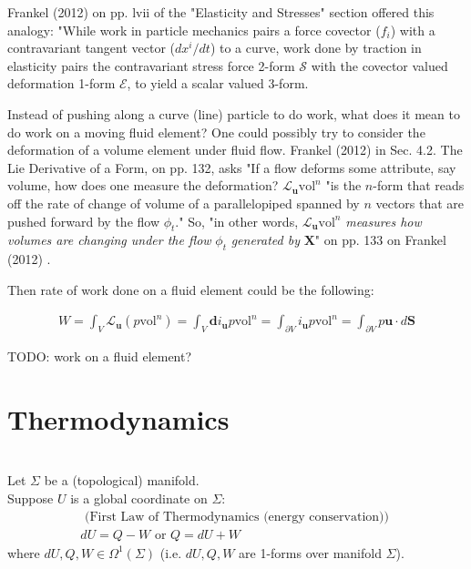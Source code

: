 \documentclass[10pt]{amsart}
\begin{document}
\begin{multicols*}{2}
Frankel (2012) \cite{TFrankel2012} on pp. lvii of the "Elasticity and Stresses" section offered this analogy: "While work in particle mechanics pairs a force covector ($f_i$) with a contravariant tangent vector ($dx^i/dt$) to a curve, work done by traction in elasticity pairs the contravariant stress force 2-form $\mathcal{S}$ with the covector valued deformation 1-form $\mathcal{E}$, to yield a scalar valued 3-form.

Instead of pushing along a curve (line) particle to do work, what does it mean to do work on a moving fluid element? One could possibly try to consider the deformation of a volume element under fluid flow. Frankel (2012) \cite{TFrankel2012} in Sec. 4.2. The Lie Derivative of a Form, on pp. 132, asks "If a flow deforms some attribute, say volume, how does one measure the deformation? $\mathcal{L}_{\mathbf{u}}\text{vol}^n$ "is the $n$-form that reads off the rate of change of volume of a parallelopiped spanned by $n$ vectors that are pushed forward by the flow $\phi_t$." So, "in other words, $\mathcal{L}_{\mathbf{u}}\text{vol}^n$ \emph{measures how volumes are changing under the flow} $\phi_t$ \emph{generated by} $\mathbf{X}$" on pp. 133 on Frankel (2012) \cite{TFrankel2012}. 

Then rate of work done on a fluid element could be the following:

\[
\begin{gathered}
W = \int_V \mathcal{L}_{\mathbf{u}}(p \text{vol}^n) = \int_V \mathbf{d} i_{\mathbf{u}} p \text{vol}^n = \int_{\partial V} i_{\mathbf{u}} p \text{vol}^n = \int_{\partial V} p \mathbf{u} \cdot d\mathbf{S} 
\end{gathered}
\]

TODO: work on a fluid element?


\section{Thermodynamics}

\quad \\ 
Let $\Sigma$ be a (topological) manifold. \\
Suppose $U$ is a global coordinate on $\Sigma$:
\begin{equation}
\begin{gathered}
\text{ (First Law of Thermodynamics (energy conservation)) } \\
\boxed{ dU = Q - W \text{ or } Q = dU + W }
\end{gathered}
\end{equation}
where $dU, Q, W \in \Omega^1(\Sigma)$ (i.e. $dU, Q, W$ are 1-forms over manifold $\Sigma$).


\end{multicols*}
\end{document}
